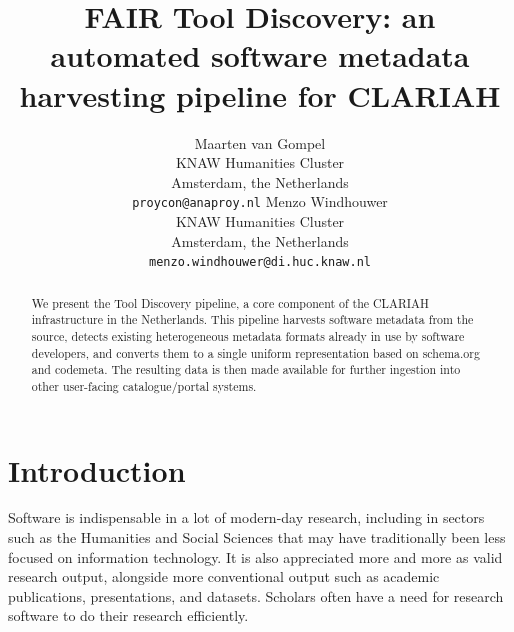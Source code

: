 \documentclass[a4paper,11pt]{article}
\title{FAIR Tool Discovery: an automated software metadata harvesting pipeline for CLARIAH}
\author{Maarten van Gompel \\
  KNAW Humanities Cluster \\
  Amsterdam, the Netherlands \\
  {\tt proycon@anaproy.nl} \And %
  Menzo Windhouwer \\
  KNAW Humanities Cluster \\
  Amsterdam, the Netherlands \\
  {\tt menzo.windhouwer@di.huc.knaw.nl}
}
\date{}
\begin{document}
\maketitle
\begin{abstract}
  We present the Tool Discovery pipeline, a core component of the CLARIAH
    infrastructure in the Netherlands. This pipeline harvests software metadata
    from the source, detects existing heterogeneous metadata formats already in
    use by software developers, and converts them to a single uniform representation
    based on schema.org and codemeta. The resulting data is then made available
    for further ingestion into other user-facing catalogue/portal systems. 
\end{abstract}

\section{Introduction} \label{intro}

%

Software is indispensable in a lot of modern-day research, including in sectors
such as the Humanities and Social Sciences that may have traditionally been
less focused on information technology. It is also appreciated more and more as
valid research output, alongside more conventional output such as academic
publications, presentations, and datasets. Scholars often have a need for
research software to do their research efficiently.
\end{document}
